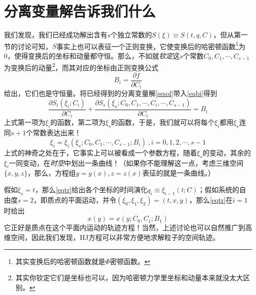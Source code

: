 \documentclass{ctexart}
\begin{document}
\section{分离变量解告诉我们什么}
我们发现，我们已经成功解出含有$s$个独立常数的$S(\xi) \equiv S(t,q,C)$，但从第一节的讨论可知，$S$事实上也可以表征一个正则变换，它使变换后的哈密顿函数\footnote{其实变换后的哈密顿函数就是$\Phi$密顿函数。}为0，使得变换后的坐标和动量都守恒。那么，不如就\emph{钦定}这$s$个常数$C_0,C_1,\cdots,C_{s-1}$为变换后的动量\footnote{其实你钦定它们是坐标也可以，因为哈密顿力学里坐标和动量本来就没太大区别。}，而其对应的坐标由正则变换公式
\begin{equation} \label{eqbi}
B_i = \frac{\partial f}{\partial C_i}
\end{equation}
给出，它们也是守恒量。将已经得到的分离变量解\cref{sesol}带入\cref{eqbi}得到
\begin{equation}
\frac{\partial S_i(\xi_i;C_i)}{\partial C_i} + \frac{\partial S_s(\xi_s;C_0,C_1,\cdots,C_i,\cdots,C_{s-1})}{\partial C_i} = B_i
\end{equation}
上式第一项为$\xi_i$的函数，第二项为$\xi_s$的函数，于是，我们就可以将每个$\xi_i$都用$\xi_s$连同$s+1$个常数表达出来！
\begin{equation} \label{eqtr}
\xi_i = \xi_i(\xi_s;C_0,C_1,\cdots,C_{s-1};B_i)\ ,i = 0,1,2,\cdots,s-1
\end{equation}
上式的神奇之处在于，它事实上可以被看成一个参数方程，随着$\xi_s$的变动，其余的$\xi_i$一同变动，在\emph{时空}中划出一条曲线！（如果你不能理解这一点，考虑三维空间$\{x,y,z\}$，那么，方程组$y = y(x), z = z(x)$表征的就是一条曲线。）
\par
假如$\xi_s = t$，那么\cref{eqtr}给出各个坐标的时间演化$q_i \equiv \xi_{i-1}(t;C)$；假如系统的自由度$s=2$，即质点的平面运动，并令$(\xi_0,\xi_1,\xi_2) = (t,x,y)$，那么\cref{eqtr}在$i=1$时给出
\begin{equation} \label{2dtr}
x(y) = x(y;C_0,C_1;B_1)
\end{equation}
它正好是质点在这个平面内运动的轨迹方程！当然，上述讨论也可以自然推广到高维空间，因此我们发现，HJ方程可以非常方便地求解粒子的空间轨迹。
\end{document}
